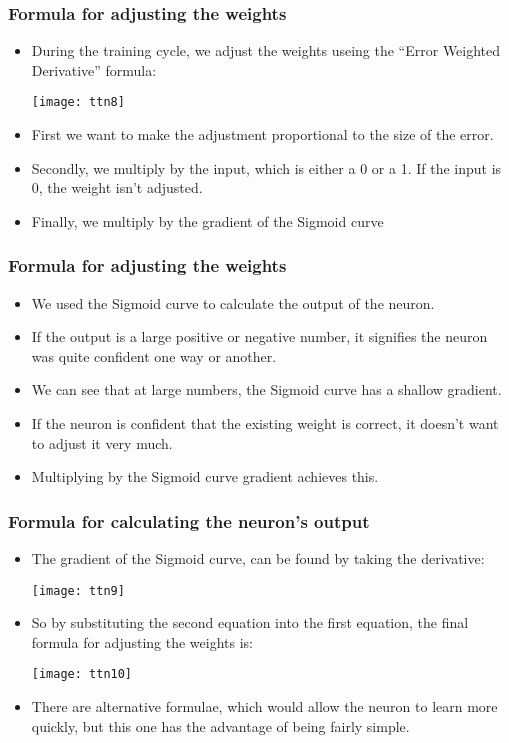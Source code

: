 \begin{frame}[fragile] \frametitle{Formula for adjusting the weights}
\begin{itemize}
\item During the training cycle, we adjust the weights useing the ``Error Weighted Derivative'' formula:
\begin{center}
\texttt{[image: ttn8]}
\end{center}
\item First we want to make the adjustment proportional to the size of the error.
\item Secondly, we multiply by the input, which is either a 0 or a 1. If the input is 0, the weight isn't adjusted. 
\item Finally, we multiply by the gradient of the Sigmoid curve
\end{itemize}
\end{frame}

\begin{frame}[fragile] \frametitle{Formula for adjusting the weights}
\begin{itemize}
\item     We used the Sigmoid curve to calculate the output of the neuron.
\item     If the output is a large positive or negative number, it signifies the neuron was quite confident one way or another.
\item     We can see that at large numbers, the Sigmoid curve has a shallow gradient.
\item      If the neuron is confident that the existing weight is correct, it doesn't want to adjust it very much. 
\item Multiplying by the Sigmoid curve gradient achieves this.
\end{itemize}
\end{frame}

\begin{frame}[fragile] \frametitle{Formula for calculating the neuron's output}
\begin{itemize}
\item The gradient of the Sigmoid curve, can be found by taking the derivative:
\begin{center}
\texttt{[image: ttn9]}
\end{center}
\item So by substituting the second equation into the first equation, the final formula for adjusting the weights is:
\begin{center}
\texttt{[image: ttn10]}
\end{center}
\item There are alternative formulae, which would allow the neuron to learn more quickly, but this one has the advantage of being fairly simple.
\end{itemize}
\end{frame}


